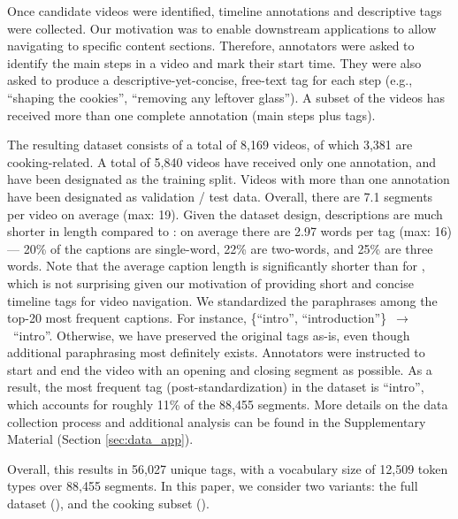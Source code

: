 \documentclass[11pt,a4paper]{article}
\begin{document}
Once candidate videos were identified, timeline annotations and descriptive tags were collected.
Our motivation was to enable downstream applications to allow navigating to specific content sections.  
Therefore, annotators were asked to identify the main steps in a video and mark their start time.  
They were also asked to produce a descriptive-yet-concise, free-text tag for each step (e.g., ``shaping the cookies'', ``removing any leftover glass'').
A subset of the videos has received more than one complete annotation (main steps plus tags).

The resulting \ldvm dataset consists of a total of 8,169 videos, of which 3,381 are cooking-related.
A total of 5,840 videos have received only one annotation, and have been designated as the training split.
Videos with more than one annotation have been designated as validation / test data.
Overall, there are 7.1 segments per video on average (max: 19).
Given the dataset design, descriptions are much shorter in length compared to \youcook: on average there are 2.97 words per tag (max: 16) --- 20\% of the captions are single-word, 22\% are two-words, and 25\% are three words.
Note that the average caption length is significantly shorter than for \youcook, which is not surprising given our motivation of providing short and concise timeline tags for video navigation.
We standardized the paraphrases among the top-20 most frequent captions.
For instance, \{``intro'', ``introduction''\}~$\to$~``intro''.
Otherwise, we have preserved the original tags as-is, even though additional paraphrasing most definitely exists.
Annotators were instructed to start and end the video with an opening and closing segment as possible.
As a result, the most frequent tag (post-standardization) in the dataset is ``intro'', which accounts for roughly 11\% of the 88,455 segments.  More details on the data collection process and additional analysis can be found in the Supplementary Material (Section \ref{sec:data_app}).

Overall, this results in 56,027 unique tags, with a vocabulary size of 12,509 token types over 88,455 segments.   
In this paper, we consider two variants: the full dataset (\ldvmmerged), and the cooking subset (\ldvmcooking).


\iffalse
\textcolor{red}{
Guidelines from EMNLP website:
\begin{itemize}
\item Relevant statistics such as number of examples
\item  Details of train/validation/test splits
\item Explanation of any data that were excluded, and all preprocessing steps
\item  A link to a downloadable version of the data
\item  For new data collected, a complete description of the data collection process, such as instructions to annotators and methods for quality control.
\end{itemize}
}
\fi
\end{document}
